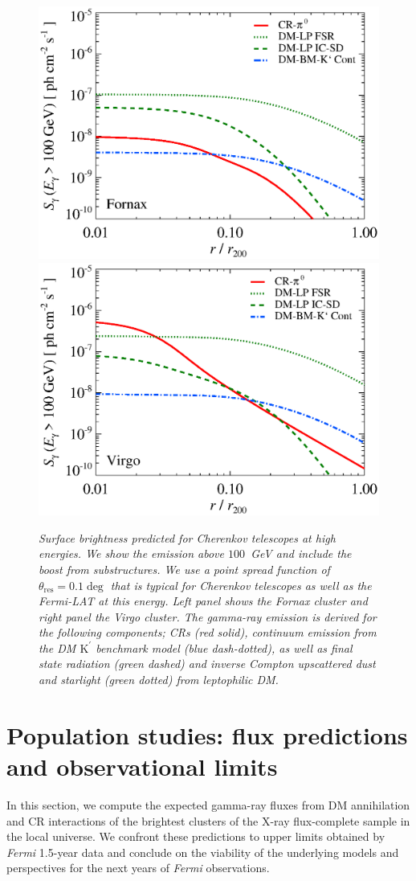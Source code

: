\documentclass[10pt,aps,pra,reprint,amsmath,amsfonts,amssymb,showpacs,nofootinbib,floatfix]{revtex4-1}
\newcommand{\Fermi}{{\em Fermi}\xspace}
\newcommand{\rmn}{\mathrm}
\newcommand{\psf}{\theta_\rmn{res}}
\newcommand{\Kp}{\rmn{K}^\prime}
\begin{document}
\begin{figure}
\begin{minipage}{2.0\columnwidth}
  \includegraphics[width=0.49\columnwidth]{figures/SB.Fornax.v13.SF700.SubMass.elmu.eps}
  \includegraphics[width=0.49\columnwidth]{figures/SB.Virgo.v13.SF700.SubMass.elmu.eps}
\caption{\it Surface brightness predicted for Cherenkov telescopes at
  high energies. We show the emission above $100$~GeV and include the
  boost from substructures. We use a point spread function of
  $\psf=0.1\deg$ that is typical for Cherenkov
  telescopes as well as the \Fermi-LAT at this energy. Left panel shows
  the Fornax cluster and right panel the Virgo cluster. The gamma-ray
  emission is derived for the following components; CRs (red solid),
  continuum emission from the DM $\Kp$ benchmark model (blue
  dash-dotted), as well as final state radiation (green dashed) and
  inverse Compton upscattered dust and starlight (green dotted) from
  leptophilic DM.}
 \label{fig:SB_IACTs}
\end{minipage}
\end{figure}



\section{Population studies: flux predictions and observational limits}

In this section, we compute the expected gamma-ray fluxes from DM
annihilation and CR interactions of the brightest clusters of the
X-ray flux-complete sample in the local universe. We confront these
predictions to upper limits obtained by \Fermi 1.5-year data and
conclude on the viability of the underlying models and perspectives
for the next years of \Fermi observations.
\end{document}
